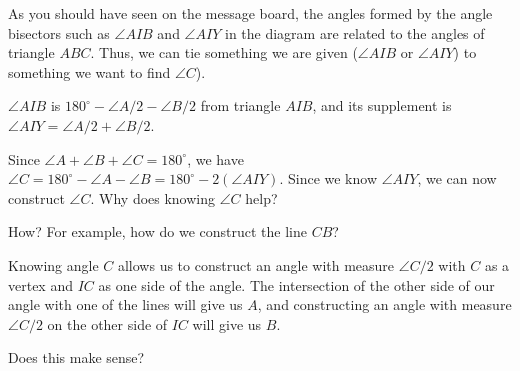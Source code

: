 

As you should have seen on the message board, the angles formed by the angle bisectors such as $\angle AIB$ and $\angle AIY$ in the diagram are related to the angles of triangle $ABC$. Thus, we can tie something we are given ($\angle AIB$ or $\angle AIY$) to something we want to find $\angle C$).

$\angle AIB$ is $180^\circ - \angle A/2 - \angle B/2$ from triangle $AIB$, and its supplement is $\angle AIY = \angle A/2 + \angle B/2$.

Since $\angle A + \angle B + \angle C = 180^\circ$, we have $\angle C = 180^\circ - \angle A - \angle B = 180^\circ - 2(\angle AIY)$. Since we know $\angle AIY$, we can now construct $\angle C$. Why does knowing $\angle C$ help?


How? For example, how do we construct the line $CB$?




Knowing angle $C$ allows us to construct an angle with measure $\angle C/2$ with $C$ as a vertex and $IC$ as one side of the angle. The intersection of the other side of our angle with one of the lines will give us $A$, and constructing an angle with measure $\angle C/2$ on the other side of $IC$ will give us $B$.

Does this make sense?


